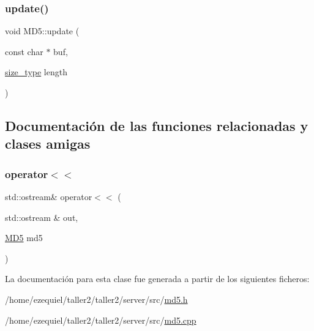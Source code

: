 \subsubsection{\texorpdfstring{update()}{update()}\hspace{0.1cm}{\footnotesize\ttfamily [2/2]}}
{\footnotesize\ttfamily void M\+D5\+::update (\begin{DoxyParamCaption}\item[{const char $\ast$}]{buf,  }\item[{\hyperlink{classMD5_aa836972700679dbcff6ae8337f6db464}{size\+\_\+type}}]{length }\end{DoxyParamCaption})}



\subsection{Documentación de las funciones relacionadas y clases amigas}
\mbox{\label{classMD5_a0739666fd0f3a7117546f6c50e0783b2}} 
\subsubsection{\texorpdfstring{operator$<$$<$}{operator<<}}
{\footnotesize\ttfamily std\+::ostream\& operator$<$$<$ (\begin{DoxyParamCaption}\item[{std\+::ostream \&}]{out,  }\item[{\hyperlink{classMD5}{M\+D5}}]{md5 }\end{DoxyParamCaption})\hspace{0.3cm}{\ttfamily [friend]}}



La documentación para esta clase fue generada a partir de los siguientes ficheros\+:\begin{DoxyCompactItemize}
\item 
/home/ezequiel/taller2/taller2/server/src/\hyperlink{md5_8h}{md5.\+h}\item 
/home/ezequiel/taller2/taller2/server/src/\hyperlink{md5_8cpp}{md5.\+cpp}\end{DoxyCompactItemize}
